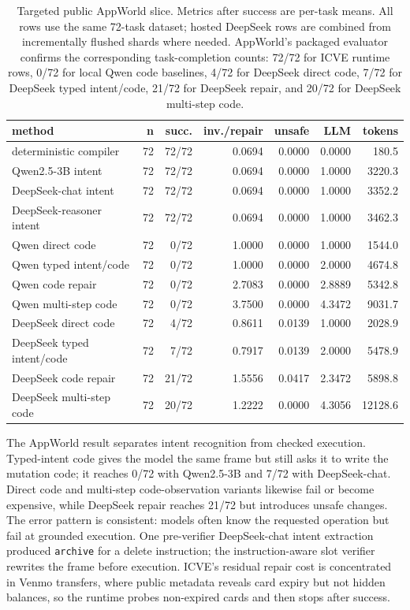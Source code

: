 \documentclass[11pt]{article}
\begin{document}
\begin{table}[t]
\centering
\scriptsize
\setlength{\tabcolsep}{4pt}
\begin{tabular}{lrrrrrr}
\toprule
method & n & succ. & inv./repair & unsafe & LLM & tokens \\
\midrule
deterministic compiler & 72 & 72/72 & 0.0694 & 0.0000 & 0.0000 & 180.5 \\
Qwen2.5-3B intent & 72 & 72/72 & 0.0694 & 0.0000 & 1.0000 & 3220.3 \\
DeepSeek-chat intent & 72 & 72/72 & 0.0694 & 0.0000 & 1.0000 & 3352.2 \\
DeepSeek-reasoner intent & 72 & 72/72 & 0.0694 & 0.0000 & 1.0000 & 3462.3 \\
Qwen direct code & 72 & 0/72 & 1.0000 & 0.0000 & 1.0000 & 1544.0 \\
Qwen typed intent/code & 72 & 0/72 & 1.0000 & 0.0000 & 2.0000 & 4674.8 \\
Qwen code repair & 72 & 0/72 & 2.7083 & 0.0000 & 2.8889 & 5342.8 \\
Qwen multi-step code & 72 & 0/72 & 3.7500 & 0.0000 & 4.3472 & 9031.7 \\
DeepSeek direct code & 72 & 4/72 & 0.8611 & 0.0139 & 1.0000 & 2028.9 \\
DeepSeek typed intent/code & 72 & 7/72 & 0.7917 & 0.0139 & 2.0000 & 5478.9 \\
DeepSeek code repair & 72 & 21/72 & 1.5556 & 0.0417 & 2.3472 & 5898.8 \\
DeepSeek multi-step code & 72 & 20/72 & 1.2222 & 0.0000 & 4.3056 & 12128.6 \\
\bottomrule
\end{tabular}
\caption{Targeted public AppWorld slice. Metrics after success are per-task means. All
rows use the same 72-task dataset; hosted DeepSeek rows are combined from incrementally
flushed shards where needed. AppWorld's packaged evaluator confirms the corresponding
task-completion counts: 72/72 for ICVE runtime rows, 0/72 for local Qwen code baselines,
4/72 for DeepSeek direct code, 7/72 for DeepSeek typed intent/code, 21/72 for DeepSeek
repair, and 20/72 for DeepSeek multi-step code.}
\label{tab:appworld-slice}
\end{table}

The AppWorld result separates intent recognition from checked execution. Typed-intent
code gives the model the same frame but still asks it to write the mutation code; it
reaches 0/72 with Qwen2.5-3B and 7/72 with DeepSeek-chat. Direct code and multi-step
code-observation variants likewise fail or become expensive, while DeepSeek repair reaches
21/72 but introduces unsafe changes. The error pattern is consistent: models often know
the requested operation but fail at grounded execution. One pre-verifier DeepSeek-chat
intent extraction produced \texttt{archive} for a delete instruction; the
instruction-aware slot verifier rewrites the frame before execution. ICVE's residual
repair cost is
concentrated in Venmo transfers, where public metadata reveals card expiry but not hidden
balances, so the runtime probes non-expired cards and then stops after success.
\end{document}
